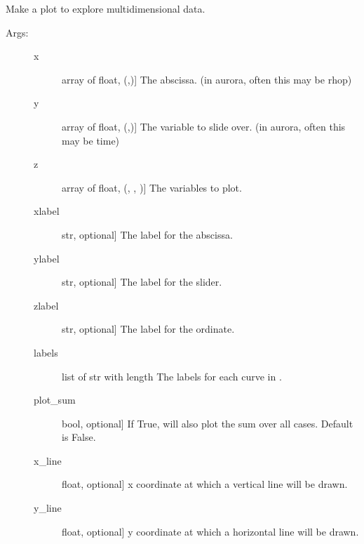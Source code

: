 \documentclass[letterpaper,10pt,english]{sphinxmanual}
\begin{document}
\begin{fulllineitems}
\label{\detokenize{aurora:aurora.plot_tools.slider_plot}}
Make a plot to explore multidimensional data.
\begin{description}
\item[{Args:}] \leavevmode\begin{description}
\item[{x}] \leavevmode{[}array of float, (,){]}
The abscissa. (in aurora, often this may be rhop)

\item[{y}] \leavevmode{[}array of float, (,){]}
The variable to slide over. (in aurora, often this may be time)

\item[{z}] \leavevmode{[}array of float, (, , ){]}
The variables to plot.

\item[{xlabel}] \leavevmode{[}str, optional{]}
The label for the abscissa.

\item[{ylabel}] \leavevmode{[}str, optional{]}
The label for the slider.

\item[{zlabel}] \leavevmode{[}str, optional{]}
The label for the ordinate.

\item[{labels}] \leavevmode{[}list of str with length \sphinxtitleref{P}{]}
The labels for each curve in .

\item[{plot\_sum}] \leavevmode{[}bool, optional{]}
If True, will also plot the sum over all  cases. Default is False.

\item[{x\_line}] \leavevmode{[}float, optional{]}
x coordinate at which a vertical line will be drawn.

\item[{y\_line}] \leavevmode{[}float, optional{]}
y coordinate at which a horizontal line will be drawn.

\end{description}

\end{description}

\end{fulllineitems}
\end{document}
